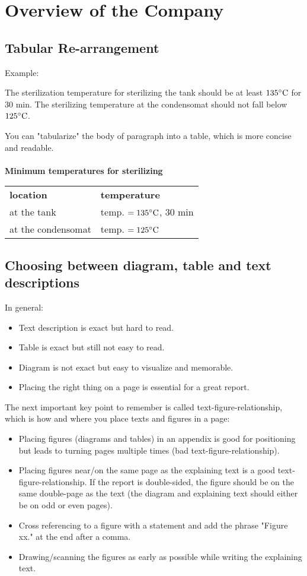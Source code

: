 \chapter{Overview of the Company}
\section{Tabular Re-arrangement}
Example:

The sterilization temperature for sterilizing the tank should be at least $ 135^\circ\text{C} $ for $ 30 $ min. The sterilizing temperature at the condensomat should not fall below $ 125^\circ\text{C} $.

You can "tabularize" the body of paragraph into a table, which is more concise and readable.\\\\
\textbf{Minimum temperatures for sterilizing}
\begin{table}[ht]
	\begin{tabular}{p{}p{}}
		\textbf{location} & \textbf{temperature}\\
		at the tank & temp. $ =135^\circ\text{C} $, 30 min\\
		at the condensomat & temp. $ =125^\circ\text{C} $
	\end{tabular}
\end{table}

\section{Choosing between diagram, table and text descriptions}
In general:
\begin{itemize}
	\item Text description is exact but hard to read.
	\item Table is exact but still not easy to read.
	\item Diagram is not exact but easy to visualize and memorable.
	\item Placing the right thing on a page is essential for a great report.
\end{itemize}
The next important key point to remember is called text-figure-relationship, which is how and where you place texts and figures in a page:
\begin{itemize}
	\item Placing figures (diagrams and tables) in an appendix is good for positioning but leads to turning pages multiple times (bad text-figure-relationship).
	\item Placing figures near/on the same page as the explaining text is a good text-figure-relationship. If the report is double-sided, the figure should be on the same double-page as the text (the diagram and explaining text should either be on odd or even pages).
	\item Cross referencing to a figure with a statement and add the phrase "Figure xx." at the end after a comma.
	\item Drawing/scanning the figures as early as possible while writing the explaining text.
\end{itemize}

